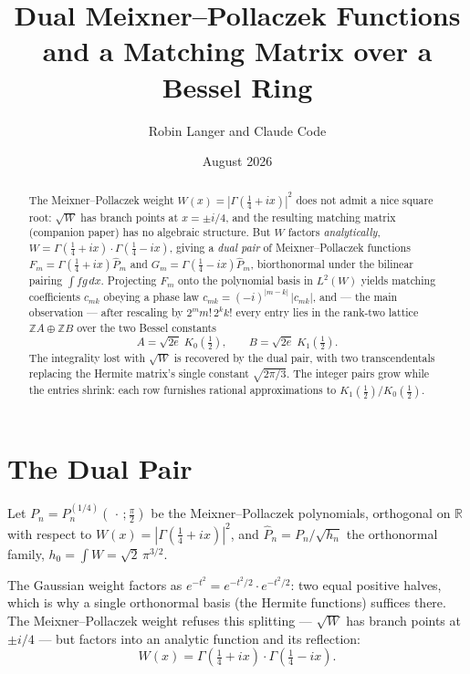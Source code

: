 \documentclass[11pt,a4paper]{article}
\title{\textbf{Dual Meixner--Pollaczek Functions\\
and a Matching Matrix over a Bessel Ring}}
\author{Robin Langer and Claude Code}
\date{August 2026}
\theoremstyle{definition}
\theoremstyle{plain}
\newcommand{\R}{\mathbb{R}}
\newcommand{\Z}{\mathbb{Z}}
\begin{document}
\maketitle

\begin{abstract}
The Meixner--Pollaczek weight $W(x) = |\Gamma(\tfrac14+ix)|^2$ does not
admit a nice square root: $\sqrt{W}$ has branch points at $x = \pm i/4$,
and the resulting matching matrix (companion paper) has no algebraic
structure. But $W$ factors \emph{analytically},
$W = \Gamma(\tfrac14+ix) \cdot \Gamma(\tfrac14-ix)$, giving a
\emph{dual pair} of Meixner--Pollaczek functions
$F_m = \Gamma(\tfrac14+ix) \widehat{P}_m$ and
$G_m = \Gamma(\tfrac14-ix) \widehat{P}_m$, biorthonormal under the
bilinear pairing $\int fg\,dx$. Projecting $F_m$ onto the polynomial
basis in $L^2(W)$ yields matching coefficients $c_{mk}$ obeying a
phase law $c_{mk} = (-i)^{|m-k|}\,|c_{mk}|$, and --- the main
observation --- after rescaling by $2^m m!\, 2^k k!$ every entry lies in
the rank-two lattice $\Z A \oplus \Z B$ over the two Bessel constants
\[
  A = \sqrt{2e}\; K_0(\tfrac12), \qquad
  B = \sqrt{2e}\; K_1(\tfrac12).
\]
The integrality lost with $\sqrt{W}$ is recovered by the dual pair,
with two transcendentals replacing the Hermite matrix's single constant
$\sqrt{2\pi/3}$. The integer pairs grow while the entries shrink:
each row furnishes rational approximations to
$K_1(\tfrac12)/K_0(\tfrac12)$.
\end{abstract}

\section{The Dual Pair}

Let $P_n = P_n^{(1/4)}(\,\cdot\,; \tfrac{\pi}{2})$ be the
Meixner--Pollaczek polynomials, orthogonal on $\R$ with respect to
$W(x) = |\Gamma(\tfrac14+ix)|^2$, and $\widehat{P}_n = P_n/\sqrt{h_n}$
the orthonormal family, $h_0 = \int W = \sqrt2\,\pi^{3/2}$.

The Gaussian weight factors as
$e^{-t^2} = e^{-t^2/2} \cdot e^{-t^2/2}$: two equal positive halves,
which is why a single orthonormal basis (the Hermite functions)
suffices there. The Meixner--Pollaczek weight refuses this splitting
--- $\sqrt{W}$ has branch points at $\pm i/4$ --- but factors into an
analytic function and its reflection:
\[
  W(x) = \Gamma(\tfrac14 + ix)\cdot\Gamma(\tfrac14 - ix).
\]
\end{document}
